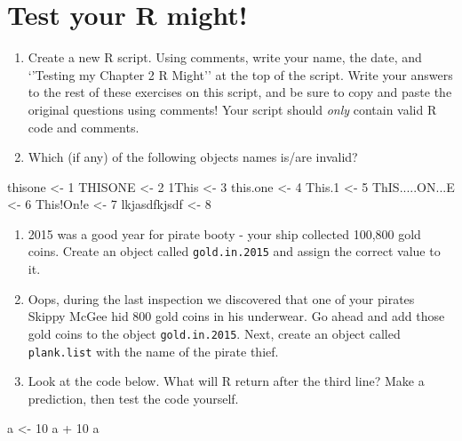 \documentclass[]{book}
\newenvironment{Shaded}{\begin{snugshade}}{\end{snugshade}}
\newcommand{\DecValTok}[1]{\textcolor[rgb]{0.00,0.00,0.81}{{#1}}}
\newcommand{\FloatTok}[1]{\textcolor[rgb]{0.00,0.00,0.81}{{#1}}}
\newcommand{\StringTok}[1]{\textcolor[rgb]{0.31,0.60,0.02}{{#1}}}
\newcommand{\NormalTok}[1]{{#1}}
\theoremstyle{definition}
\theoremstyle{definition}
\theoremstyle{remark}
\begin{document}
\section{Test your R might!}\label{test-your-r-might}

\begin{enumerate}
\def\labelenumi{\arabic{enumi}.}
\item
  Create a new R script. Using comments, write your name, the date, and
  `'Testing my Chapter 2 R Might'' at the top of the script. Write your
  answers to the rest of these exercises on this script, and be sure to
  copy and paste the original questions using comments! Your script
  should \textit{only} contain valid R code and comments.
\item
  Which (if any) of the following objects names is/are invalid?
\end{enumerate}

\begin{Shaded}
\begin{Highlighting}[]
\NormalTok{thisone <-}\StringTok{ }\DecValTok{1}
\NormalTok{THISONE <-}\StringTok{ }\DecValTok{2}
\NormalTok{1This <-}\StringTok{ }\DecValTok{3}
\NormalTok{this.one <-}\StringTok{ }\DecValTok{4}
\NormalTok{This}\FloatTok{.1} \NormalTok{<-}\StringTok{ }\DecValTok{5}
\NormalTok{ThIS.....ON...E <-}\StringTok{ }\DecValTok{6}
\NormalTok{This!On!e <-}\StringTok{ }\DecValTok{7}
\NormalTok{lkjasdfkjsdf <-}\StringTok{ }\DecValTok{8}
\end{Highlighting}
\end{Shaded}

\begin{enumerate}
\def\labelenumi{\arabic{enumi}.}
\setcounter{enumi}{2}
\item
  2015 was a good year for pirate booty - your ship collected 100,800
  gold coins. Create an object called \texttt{gold.in.2015} and assign
  the correct value to it.
\item
  Oops, during the last inspection we discovered that one of your
  pirates Skippy McGee hid 800 gold coins in his underwear. Go ahead and
  add those gold coins to the object \texttt{gold.in.2015}. Next, create
  an object called \texttt{plank.list} with the name of the pirate
  thief.
\item
  Look at the code below. What will R return after the third line? Make
  a prediction, then test the code yourself.
\end{enumerate}

\begin{Shaded}
\begin{Highlighting}[]
\NormalTok{a <-}\StringTok{ }\DecValTok{10}
\NormalTok{a +}\StringTok{ }\DecValTok{10}
\NormalTok{a}
\end{Highlighting}
\end{Shaded}
\end{document}
